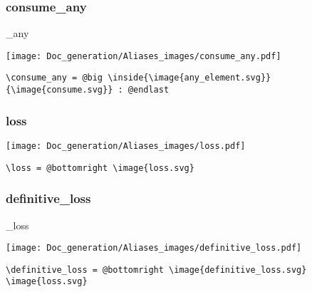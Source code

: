 \documentclass{article}
\begin{document}
\subsubsection{consume\_any}
\begin{minipage}{0.45\linewidth}
\raggedright
\begin{spverbatim}
\consume_any 
\end{spverbatim}
\end{minipage}
\begin{minipage}{0.45\linewidth}
\raggedleft
\texttt{[image: Doc\_generation/Aliases\_images/consume\_any.pdf]}
\end{minipage}
\begin{center}
\begin{BVerbatim}
\consume_any = @big \inside{\image{any_element.svg}}{\image{consume.svg}} : @endlast
\end{BVerbatim}
\end{center}

\subsubsection{loss}
\begin{minipage}{0.45\linewidth}
\raggedright
\begin{spverbatim}
\loss 
\end{spverbatim}
\end{minipage}
\begin{minipage}{0.45\linewidth}
\raggedleft
\texttt{[image: Doc\_generation/Aliases\_images/loss.pdf]}
\end{minipage}
\begin{center}
\begin{BVerbatim}
\loss = @bottomright \image{loss.svg}
\end{BVerbatim}
\end{center}

\subsubsection{definitive\_loss}
\begin{minipage}{0.45\linewidth}
\raggedright
\begin{spverbatim}
_loss 
\end{spverbatim}
\end{minipage}
\begin{minipage}{0.45\linewidth}
\raggedleft
\texttt{[image: Doc\_generation/Aliases\_images/definitive\_loss.pdf]}
\end{minipage}
\begin{center}
\begin{BVerbatim}
\definitive_loss = @bottomright \image{definitive_loss.svg} \image{loss.svg}
\end{BVerbatim}
\end{center}
\end{document}
